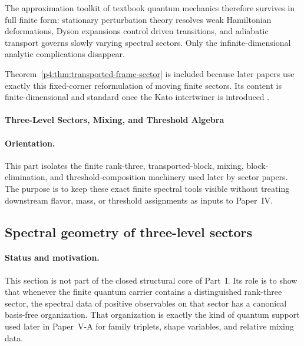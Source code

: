 \documentclass[12pt,a4paper]{article}
\begin{document}
The approximation toolkit of textbook quantum mechanics therefore survives in full finite form:
stationary perturbation theory resolves weak Hamiltonian deformations, Dyson expansions control driven transitions, and adiabatic transport governs slowly varying spectral sectors.
Only the infinite-dimensional analytic complications disappear.

\begin{remark}
\label{p4:rem:transported-frame-status}
Theorem~\ref{p4:thm:transported-frame-sector} is included because later papers use exactly this fixed-corner reformulation of moving finite sectors.
Its content is finite-dimensional and standard once the Kato intertwiner is introduced \cite{Kato1950,Teufel2003}.
\end{remark}



\paragraph{Three-Level Sectors, Mixing, and Threshold Algebra}
\label{p4:part:three-level-mixing-thresholds}

\paragraph{Orientation.}
This part isolates the finite rank-three, transported-block, mixing, block-elimination, and threshold-composition machinery used later by sector papers.  The purpose is to keep these exact finite spectral tools visible without treating downstream flavor, mass, or threshold assignments as inputs to Paper~IV.



\subsection{Spectral geometry of three-level sectors}
\label{p4:sec:part2-threelevel}

\paragraph{Status and motivation.}
This section is not part of the closed structural core of Part~I.
Its role is to show that whenever the finite quantum carrier contains a distinguished rank-three sector, the spectral data of positive observables on that sector has a canonical basis-free organization.
That organization is exactly the kind of quantum support used later in Paper~V-A for family triplets, shape variables, and relative mixing data.
\end{document}
